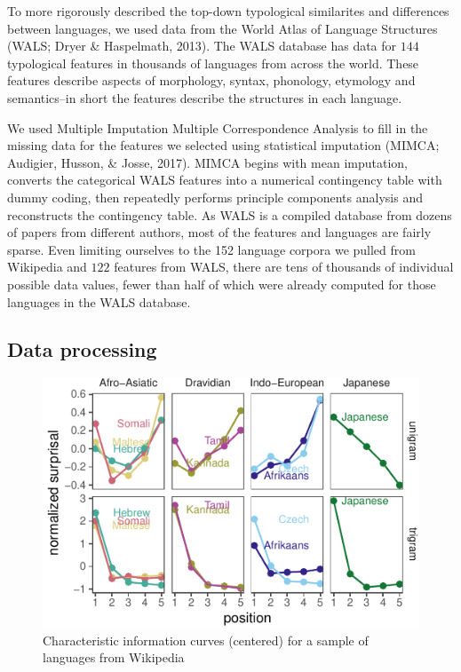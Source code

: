 \documentclass[man,floatsintext]{apa6}
\begin{document}
To more rigorously described the top-down typological similarites and differences between languages, we used data from the World Atlas of Language Structures (WALS; Dryer \& Haspelmath, 2013). The WALS database has data for \(144\) typological features in thousands of languages from across the world. These features describe aspects of morphology, syntax, phonology, etymology and semantics--in short the features describe the structures in each language.

We used Multiple Imputation Multiple Correspondence Analysis to fill in the missing data for the features we selected using statistical imputation (MIMCA; Audigier, Husson, \& Josse, 2017). MIMCA begins with mean imputation, converts the categorical WALS features into a numerical contingency table with dummy coding, then repeatedly performs principle components analysis and reconstructs the contingency table. As WALS is a compiled database from dozens of papers from different authors, most of the features and languages are fairly sparse. Even limiting ourselves to the 152 language corpora we pulled from Wikipedia and \(122\) features from WALS, there are tens of thousands of individual possible data values, fewer than half of which were already computed for those languages in the WALS database.

\hypertarget{data-processing-1}{%
\subsection{Data processing}\label{data-processing-1}}

\begin{figure}
\centering
\includegraphics{figs/diff-languages-1.pdf}
\caption{\label{fig:diff-languages}Characteristic information curves (centered) for a sample of languages from Wikipedia}
\end{figure}
\end{document}
